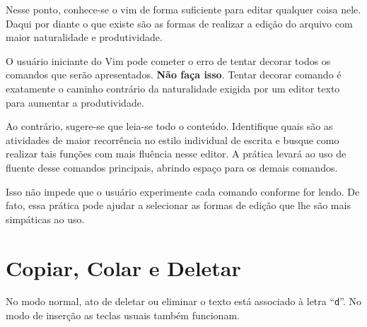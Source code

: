 Nesse ponto, conhece-se o vim de forma suficiente para editar
qualquer coisa nele. Daqui por diante o que existe são as formas de
realizar a edição do arquivo com maior naturalidade e produtividade.

O usuário iniciante do Vim pode cometer o erro de tentar decorar 
todos os comandos que serão apresentados. {\bf Não faça isso}. Tentar decorar
comando é exatamente o caminho contrário da naturalidade exigida por 
um editor texto para aumentar a produtividade.

Ao contrário, sugere-se que leia-se todo o conteúdo. Identifique 
quais são as atividades de maior recorrência no estilo individual de 
escrita e busque como realizar tais funções com mais fluência nesse
editor. A prática levará ao uso de fluente desse comandos principais,
abrindo espaço para os demais comandos.

Isso não impede que o usuário experimente cada comando conforme for lendo.
De fato, essa prática pode ajudar a selecionar as formas de edição que lhe
são mais simpáticas ao uso.

\section{Copiar, Colar e Deletar}\label{sec:CopiarColarEDeletar}
No modo normal, ato de deletar ou eliminar o texto está associado
à letra ``\verb|d|''. No modo de inserção as teclas usuais também 
funcionam.

